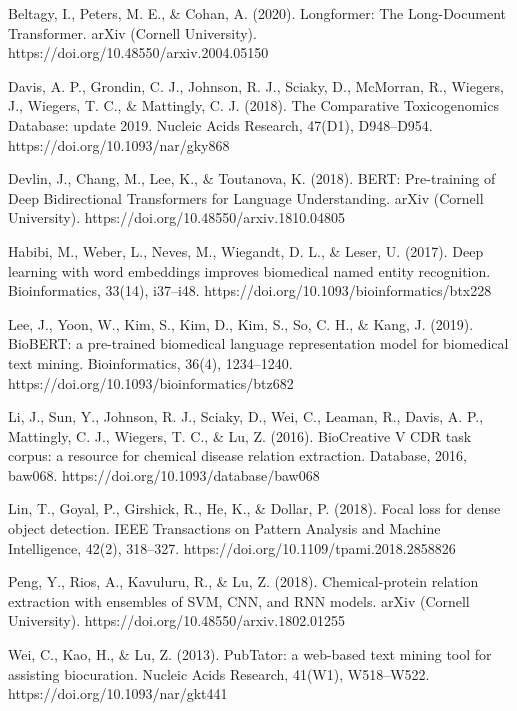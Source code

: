 \documentclass{amia}
\begin{document}

\begin{thebibliography}{12}

Beltagy, I., Peters, M. E., \& Cohan, A. (2020). Longformer: The Long-Document Transformer. arXiv (Cornell University). https://doi.org/10.48550/arxiv.2004.05150

Davis, A. P., Grondin, C. J., Johnson, R. J., Sciaky, D., McMorran, R., Wiegers, J., Wiegers, T. C., \& Mattingly, C. J. (2018). The Comparative Toxicogenomics Database: update 2019. Nucleic Acids Research, 47(D1), D948–D954. https://doi.org/10.1093/nar/gky868

Devlin, J., Chang, M., Lee, K., \& Toutanova, K. (2018). BERT: Pre-training of Deep Bidirectional Transformers for Language Understanding. arXiv (Cornell University). https://doi.org/10.48550/arxiv.1810.04805

Habibi, M., Weber, L., Neves, M., Wiegandt, D. L., \& Leser, U. (2017). Deep learning with word embeddings improves biomedical named entity recognition. Bioinformatics, 33(14), i37–i48. https://doi.org/10.1093/bioinformatics/btx228

Lee, J., Yoon, W., Kim, S., Kim, D., Kim, S., So, C. H., \& Kang, J. (2019). BioBERT: a pre-trained biomedical language representation model for biomedical text mining. Bioinformatics, 36(4), 1234–1240. https://doi.org/10.1093/bioinformatics/btz682

Li, J., Sun, Y., Johnson, R. J., Sciaky, D., Wei, C., Leaman, R., Davis, A. P., Mattingly, C. J., Wiegers, T. C., \& Lu, Z. (2016). BioCreative V CDR task corpus: a resource for chemical disease relation extraction. Database, 2016, baw068. https://doi.org/10.1093/database/baw068

Lin, T., Goyal, P., Girshick, R., He, K., \& Dollar, P. (2018). Focal loss for dense object detection. IEEE Transactions on Pattern Analysis and Machine Intelligence, 42(2), 318–327. https://doi.org/10.1109/tpami.2018.2858826

Peng, Y., Rios, A., Kavuluru, R., \& Lu, Z. (2018). Chemical-protein relation extraction with ensembles of SVM, CNN, and RNN models. arXiv (Cornell University). https://doi.org/10.48550/arxiv.1802.01255

Wei, C., Kao, H., \& Lu, Z. (2013). PubTator: a web-based text mining tool for assisting biocuration. Nucleic Acids Research, 41(W1), W518–W522. https://doi.org/10.1093/nar/gkt441


\end{thebibliography}
\end{document}
